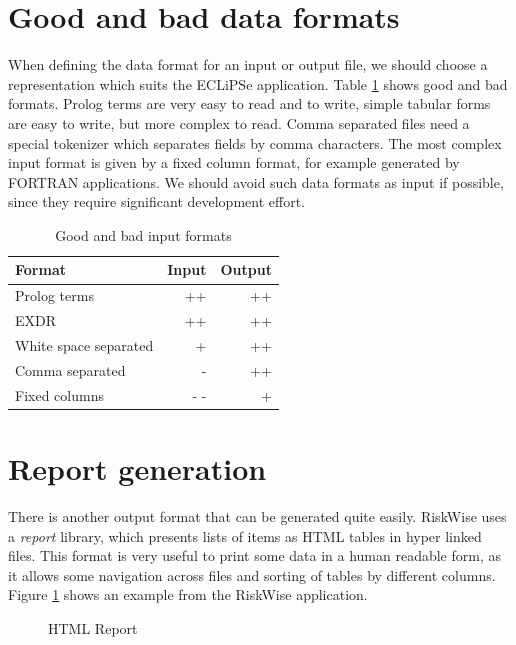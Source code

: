 \documentclass[a4paper,12pt]{report}
\begin{document}
\section{Good and bad data formats}
When defining the data format for an input or output file, we should choose a representation which suits the ECLiPSe application. Table \ref{InputFormats} shows good and bad formats. Prolog terms are very easy to read and to write, simple tabular forms are easy to write, but more complex to read. Comma separated files need a special tokenizer which separates fields by comma characters. The most complex input format is given by a fixed column format, for example generated by FORTRAN applications. We should avoid such data formats as input if possible, since they require significant development effort.
\begin{table}[htbp]
\begin{center}
\begin{tabular}{|l|r|r|}
\hline
Format & Input & Output \\ \hline
Prolog terms & ++ & ++ \\ \hline
EXDR & ++ & ++ \\ \hline
White space separated & + & ++ \\ \hline
Comma separated & - & ++ \\ \hline
Fixed columns & - - & + \\ \hline
\end{tabular}
\end{center}
\caption{\label{InputFormats}Good and bad input formats}
\end{table}

\section{Report generation}
There is another output format that can be generated quite easily. RiskWise uses a {\it report} library, which presents lists of items as HTML tables in hyper linked files. This format is very useful to print some data in a human readable form, as it allows some navigation across files and sorting of tables by different columns. Figure \ref{HTMLReport} shows an example from the RiskWise application.

\begin{figure}[thbp]
\begin{center}
\end{center}
\caption{\label{HTMLReport}HTML Report}
\end{figure}
\end{document}

